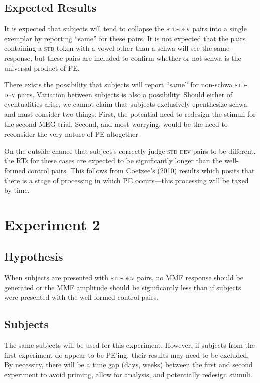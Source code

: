 \documentclass[jou,apacite]{apa6}
\begin{document}
    \subsection{Expected Results}
    It is expected that subjects will tend to collapse the \textsc{std-dev} pairs into a single exemplar by reporting “same” for these pairs. It is not expected that the pairs containing a \textsc{std} token with a vowel other than a schwa will see the same response, but these pairs are included to confirm whether or not schwa is the universal product of PE.
    
    There exists the possibility that subjects will report “same” for non-schwa \textsc{std-dev} pairs. Variation between subjects is also a possibility. Should either of eventualities arise, we cannot claim that subjects exclusively epenthesize schwa and must consider two things. First, the potential need to redesign the stimuli for the second MEG trial. Second, and most worrying, would be the need to reconsider the very nature of PE altogether
    
    On the outside chance that subject’s correctly judge \textsc{std-dev} pairs to be different, the RTs for these cases are expected to be significantly longer than the well-formed control pairs. This follows from Coetzee’s (2010) results which posits that there is a stage of processing in which PE occurs—this processing will be taxed by time.
    
\section{Experiment 2}

    \subsection{Hypothesis}
    When subjects are presented with \textsc{std-dev} pairs, no MMF response should be generated or the MMF amplitude should be significantly less than if subjects were presented with the well-formed control pairs.
    
    \subsection{Subjects}
    The same subjects will be used for this experiment. However, if subjects from the first experiment do appear to be PE’ing, their results may need to be excluded. By necessity, there will be a time gap (days, weeks) between the first and second experiment to avoid priming, allow for analysis, and potentially redesign stimuli.
    
\end{document}
